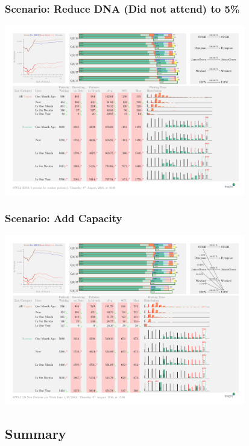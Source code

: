 \begin{frame}
\frametitle{Scenario: Reduce DNA (Did not attend) to 5\%}
\includegraphics[width=10.5cm]{imagesoutpatient/dna5percent}
\end{frame}

\begin{frame}
\frametitle{Scenario: Add Capacity}
\includegraphics[width=10.5cm]{imagesoutpatient/drnew}
\end{frame}


\subsection{Summary}

